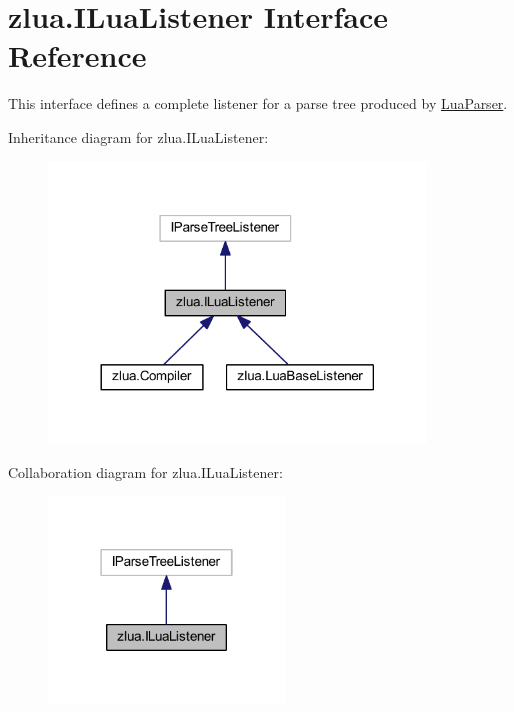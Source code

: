 \hypertarget{interfacezlua_1_1_i_lua_listener}{}\section{zlua.\+I\+Lua\+Listener Interface Reference}
\label{interfacezlua_1_1_i_lua_listener}


This interface defines a complete listener for a parse tree produced by \mbox{\hyperlink{classzlua_1_1_lua_parser}{Lua\+Parser}}.  




Inheritance diagram for zlua.\+I\+Lua\+Listener\+:
\nopagebreak
\begin{figure}[H]
\begin{center}
\leavevmode
\includegraphics[width=284pt]{interfacezlua_1_1_i_lua_listener__inherit__graph}
\end{center}
\end{figure}


Collaboration diagram for zlua.\+I\+Lua\+Listener\+:
\nopagebreak
\begin{figure}[H]
\begin{center}
\leavevmode
\includegraphics[width=178pt]{interfacezlua_1_1_i_lua_listener__coll__graph}
\end{center}
\end{figure}
